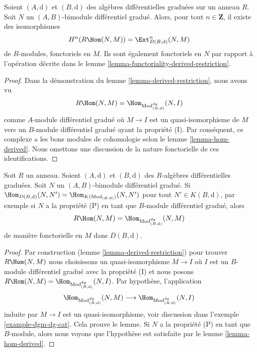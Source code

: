 \begin{lemma}
\label{lemma-derived-restriction-exts}
Soient $(A, \text{d})$ et $(B, \text{d})$ des algèbres différentielles
graduées sur un anneau $R$. Soit $N$ un $(A, B)$-bimodule différentiel gradué.
Alors, pour tout $n \in \mathbf{Z}$, il existe des isomorphismes
$$
H^n(R\Hom(N, M)) = \Ext^n_{D(B, \text{d})}(N, M)
$$
de $R$-modules, fonctoriels en $M$. Ils sont également fonctoriels
en $N$ par rapport à l'opération décrite dans
le lemme \ref{lemma-functoriality-derived-restriction}.
\end{lemma}

\begin{proof}
Dans la démonstration du lemme
\ref{lemma-derived-restriction}, nous avons vu
$$
R\Hom(N, M) =
\Hom_{\text{Mod}^{dg}_{(B, \text{d})}}(N, I)
$$
comme $A$-module différentiel gradué
où $M \to I$ est un quasi-isomorphisme de $M$ vers un $B$-module
différentiel gradué ayant la propriété (I). Par conséquent, ce complexe a les
bons modules de cohomologie selon le lemme \ref{lemma-hom-derived}.
Nous omettons une discussion de la nature fonctorielle de ces
identifications.
\end{proof}

\begin{lemma}
\label{lemma-compute-derived-restriction}
Soit $R$ un anneau. Soient $(A, \text{d})$ et $(B, \text{d})$ des
$R$-algèbres différentielles graduées. Soit $N$ un $(A,
B)$-bimodule différentiel gradué. Si
$\Hom_{D(B, \text{d})}(N, N') = \Hom_{K(\text{Mod}_{(B, \text{d})})}(N, N')$ pour
tout $N' \in K(B, \text{d})$, par exemple si $N$ a la
propriété (P) en tant que $B$-module différentiel gradué, alors
$$
R\Hom(N, M) = \Hom_{\text{Mod}^{dg}_{(B, \text{d})}}(N, M)
$$
de manière fonctorielle en $M$ dans $D(B, \text{d})$.
\end{lemma}

\begin{proof}
Par construction (lemme \ref{lemma-derived-restriction}) pour
trouver $R\Hom(N, M)$ nous choisissons un
quasi-isomorphisme $M \to I$ où $I$ est un $B$-module différentiel gradué avec
la propriété (I) et nous posons
$R\Hom(N, M) = \Hom_{\text{Mod}^{dg}_{(B, \text{d})}}(N, I)$. Par
hypothèse, l'application
$$
\Hom_{\text{Mod}^{dg}_{(B, \text{d})}}(N, M) \longrightarrow
\Hom_{\text{Mod}^{dg}_{(B, \text{d})}}(N, I)
$$
induite par $M \to I$ est un quasi-isomorphisme, voir discussion dans
l'exemple \ref{example-dgm-dg-cat}. Cela prouve le lemme. Si
$N$ a la propriété (P) en tant que $B$-module, alors nous voyons que
l'hypothèse est satisfaite par le lemme \ref{lemma-hom-derived}.
\end{proof}




